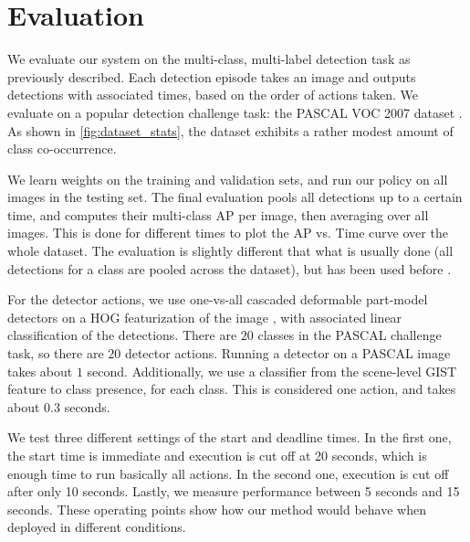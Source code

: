 \section{Evaluation} \label{sec:evaluation}

We evaluate our system on the multi-class, multi-label detection task as previously described.
Each detection episode takes an image and outputs detections with associated times, based on the order of actions taken.
We evaluate on a popular detection challenge task: the PASCAL VOC 2007 dataset \cite{pascal-voc-2010}.
As shown in \autoref{fig:dataset_stats}, the dataset exhibits a rather modest amount of class co-occurrence.

We learn weights on the training and validation sets, and run our policy on all images in the testing set.
The final evaluation pools all detections up to a certain time, and computes their multi-class AP per image, then averaging over all images.
This is done for different times to plot the AP vs. Time curve over the whole dataset.
The evaluation is slightly different that what is usually done (all detections for a class are pooled across the dataset), but has been used before \cite{Desai2009}.

For the detector actions, we use one-vs-all cascaded deformable part-model detectors on a HOG featurization of the image \cite{Felzenszwalb2010b}, with associated linear classification of the detections.
There are $20$ classes in the PASCAL challenge task, so there are $20$ detector actions.
Running a detector on a PASCAL image takes about $1$ second.
Additionally, we use a classifier from the scene-level GIST feature to class presence, for each class.
This is considered one action, and takes about $0.3$ seconds.

We test three different settings of the start and deadline times.
In the first one, the start time is immediate and execution is cut off at 20 seconds, which is enough time to run basically all actions.
In the second one, execution is cut off after only 10 seconds.
Lastly, we measure performance between 5 seconds and 15 seconds.
These operating points show how our method would behave when deployed in different conditions.

